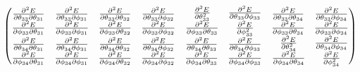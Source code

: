 \documentclass[9pt]{article}
\begin{document}
\begin{equation*}
\begin{pmatrix}
\begin{matrix}
			\pdv{E}{\theta_{33}}{\theta_{31}} & \pdv{E}{\theta_{33}}{\phi_{31}} \\
			\pdv{E}{\phi_{33}}{\theta_{31}} & \pdv{E}{\phi_{33}}{\phi_{31}} 
		\end{matrix} & 
		\begin{matrix} 
			\pdv{E}{\theta_{33}}{\theta_{32}} & \pdv{E}{\theta_{33}}{\phi_{32}} \\
			\pdv{E}{\phi_{33}}{\theta_{32}} & \pdv{E}{\phi_{33}}{\phi_{32}} 
		\end{matrix}&
		\begin{matrix} 
			\pdv[2]{E}{\theta_{33}} & \pdv{E}{\theta_{33}}{\phi_{33}} \\
			\pdv{E}{\phi_{33}}{\theta_{33}} & \pdv[2]{E}{\phi_{33}} 
		\end{matrix}&
		\begin{matrix} 
			\pdv{E}{\theta_{33}}{\theta_{34}} & \pdv{E}{\theta_{33}}{\phi_{34}} \\
			\pdv{E}{\phi_{33}}{\theta_{34}} & \pdv{E}{\phi_{33}}{\phi_{34}} 
		\end{matrix}\\
		\begin{matrix} 
			\pdv{E}{\theta_{34}}{\theta_{31}} & \pdv{E}{\theta_{34}}{\phi_{31}} \\
			\pdv{E}{\phi_{34}}{\theta_{31}} & \pdv{E}{\phi_{34}}{\phi_{31}} 
		\end{matrix} & 
		\begin{matrix} 
			\pdv{E}{\theta_{34}}{\theta_{32}} & \pdv{E}{\theta_{34}}{\phi_{32}} \\
			\pdv{E}{\phi_{34}}{\theta_{32}} & \pdv{E}{\phi_{34}}{\phi_{32}} 
		\end{matrix}&
		\begin{matrix} 
			\pdv{E}{\theta_{34}}{\theta_{33}} & \pdv{E}{\theta_{34}}{\phi_{33}} \\
			\pdv{E}{\phi_{34}}{\theta_{33}} & \pdv{E}{\phi_{34}}{\phi_{33}}
		\end{matrix}&
		\begin{matrix} 
			\pdv[2]{E}{\theta_{34}} & \pdv{E}{\theta_{34}}{\phi_{34}} \\
			\pdv{E}{\phi_{34}}{\theta_{34}} & \pdv[2]{E}{\phi_{34}} 
		\end{matrix}
	\end{pmatrix}
\end{equation*}
\end{document}
